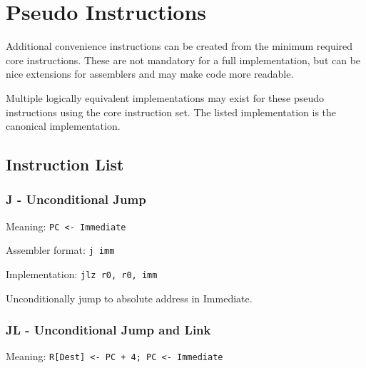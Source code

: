 \documentclass{article}
\begin{document}
\noindent{}


\section{Pseudo Instructions}
Additional convenience instructions can be created from the minimum required core instructions.
These are not mandatory for a full implementation, but can be nice extensions for assemblers and
may make code more readable.

Multiple logically equivalent implementations may exist for these pseudo instructions using the
core instruction set. The listed implementation is the canonical implementation.

\subsection{Instruction List}

\subsubsection{J - Unconditional Jump}
Meaning: \verb|PC <- Immediate|

Assembler format: \verb|j imm|

Implementation: \verb|jlz r0, r0, imm|

Unconditionally jump to absolute address in Immediate.

\subsubsection{JL - Unconditional Jump and Link}
Meaning: \verb|R[Dest] <- PC + 4; PC <- Immediate|
\end{document}
